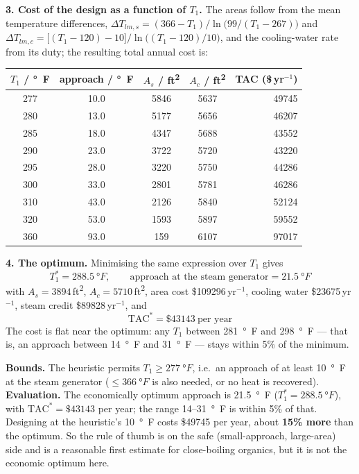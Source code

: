 \documentclass[10pt,a4paper]{article}
\begin{document}
\textbf{3. Cost of the design as a function of $T_1$.} The areas follow from the mean temperature
differences, $\Delta T_{lm,s}=(366-T_1)/\ln\!\big(99/(T_1-267)\big)$ and
$\Delta T_{lm,c}=\big[(T_1-120)-10\big]/\ln\!\big((T_1-120)/10\big)$, and the cooling-water rate
from its duty; the resulting total annual cost is:
{\footnotesize\setlength{\tabcolsep}{5pt}%
\begin{tabular}{@{}S[table-format=3.0] S[table-format=2.1] S[table-format=4.0] S[table-format=4.0] r@{}}
\toprule
{$T_1$ / \si{\degree F}} & {approach / \si{\degree F}} & {$A_s$ / \si{ft^2}} & {$A_c$ / \si{ft^2}} & {TAC (\$\,yr$^{-1}$)}\\
 & 10.0 & 5846 & 5637 & 49745\\
280 & 13.0 & 5177 & 5656 & 46207\\
285 & 18.0 & 4347 & 5688 & 43552\\
290 & 23.0 & 3722 & 5720 & 43220\\
295 & 28.0 & 3220 & 5750 & 44286\\
300 & 33.0 & 2801 & 5781 & 46286\\
310 & 43.0 & 2126 & 5840 & 52124\\
320 & 53.0 & 1593 & 5897 & 59552\\
360 & 93.0 & 159 & 6107 & 97017\\
\bottomrule
\end{tabular}}

\textbf{4. The optimum.} Minimising the same expression over $T_1$ gives
\[
T_1^{*}=\SI{288.5}{\degree F},\qquad\text{approach at the steam generator}=\SI{21.5}{\degree F}
\]
with $A_s=3894$\,\si{ft^2}, $A_c=5710$\,\si{ft^2}, area cost
\$\num{109296}\,yr$^{-1}$, cooling water \$\num{23675}\,yr$^{-1}$, steam credit
\$\num{89828}\,yr$^{-1}$, and
\[
\text{TAC}^{*}=\$\num{43143}\ \text{per year}
\]
The cost is flat near the optimum: any $T_1$ between \SI{281}{\degree F} and \SI{298}{\degree F}
--- that is, an approach between \SI{14}{\degree F} and \SI{31}{\degree F} --- stays within 5\% of
the minimum.

\begin{ansbox}
\textbf{Bounds.} The heuristic permits $T_1\ge\SI{277}{\degree F}$, i.e.\ an approach of at least
\SI{10}{\degree F} at the steam generator ($\le\SI{366}{\degree F}$ is also needed, or no heat is
recovered).\\
\textbf{Evaluation.} The economically optimum approach is \SI{21.5}{\degree F}
($T_1^{*}=\SI{288.5}{\degree F}$), with $\text{TAC}^{*}=\$\num{43143}$ per year; the range
\SI{14}{}--\SI{31}{\degree F} is within 5\% of that. Designing at the heuristic's
\SI{10}{\degree F} costs \$\num{49745} per year, about \textbf{15\% more} than the optimum. So the
rule of thumb is on the safe (small-approach, large-area) side and is a reasonable first estimate for
close-boiling organics, but it is not the economic optimum here.
\end{ansbox}
\end{document}
